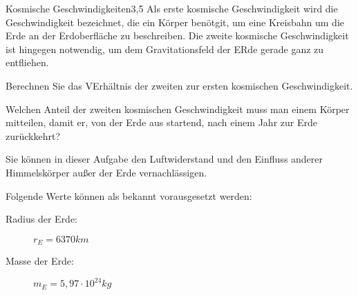 


\begin{problem}{Kosmische Geschwindigkeiten}{3,5}
Als erste kosmische Geschwindigkeit wird die Geschwindigkeit bezeichnet, die ein Körper benötgit, um eine Kreisbahn um die Erde an der Erdoberfläche zu beschreiben.  Die zweite kosmische Geschwindigkeit ist hingegen notwendig, um dem Gravitationsfeld der ERde gerade ganz zu entfliehen.
\begin{abcenum}
  \item Berechnen Sie das VErhältnis der zweiten zur ersten kosmischen Geschwindigkeit.
  \item Welchen Anteil der zweiten kosmischen Geschwindigkeit muss man einem Körper mitteilen, damit er, von der Erde aus startend, nach einem Jahr zur Erde zurückkehrt?
\end{abcenum}

Sie können in dieser Aufgabe den Luftwiderstand und den Einfluss anderer Himmelskörper außer der Erde vernachlässigen.

Folgende Werte können als bekannt vorausgesetzt werden:
\begin{description}
\item[Radius der Erde:] $r_E=6370\unit{km}$
\item[Masse der Erde:] $m_E=5,97\cdot 10^{24}\unit{kg}$
\end{description}
\begin{solution}
\end{solution}
\end{problem}


